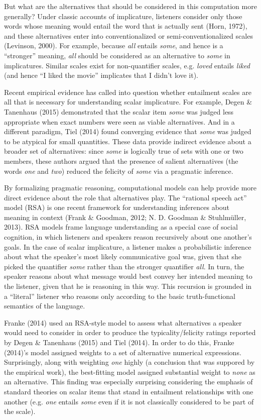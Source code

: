 \documentclass[10pt, letterpaper]{article}
\begin{document}
But what are the alternatives that should be considered in this
computation more generally? Under classic accounts of implicature,
listeners consider only those words whose meaning would entail the word
that is actually sent (Horn, 1972), and these alternatives enter into
conventionalized or semi-conventionalized scales (Levinson, 2000). For
example, because \emph{all} entails \emph{some}, and hence is a
``stronger'' meaning, \emph{all} should be considered as an alternative
to \emph{some} in implicatures. Similar scales exist for non-quantifier
scales, e.g. \emph{loved} entails \emph{liked} (and hence ``I liked the
movie'' implicates that I didn't love it).

Recent empirical evidence has called into question whether entailment
scales are all that is necessary for understanding scalar implicature.
For example, Degen \& Tanenhaus (2015) demonstrated that the scalar item
\emph{some} was judged less appropriate when exact numbers were seen as
viable alternatives. And in a different paradigm, Tiel (2014) found
converging evidence that \emph{some} was judged to be atypical for small
quantities. These data provide indirect evidence about a broader set of
alternatives: since \emph{some} is logically true of sets with one or
two members, these authors argued that the presence of salient
alternatives (the words \emph{one} and \emph{two}) reduced the felicity
of \emph{some} via a pragmatic inference.

By formalizing pragmatic reasoning, computational models can help
provide more direct evidence about the role that alternatives play. The
``rational speech act'' model (RSA) is one recent framework for
understanding inferences about meaning in context (Frank \& Goodman,
2012; N. D. Goodman \& Stuhlm{ü}ller, 2013). RSA models frame language
understanding as a special case of social cognition, in which listeners
and speakers reason recursively about one another's goals. In the case
of scalar implicature, a listener makes a probabilistic inference about
what the speaker's most likely communicative goal was, given that she
picked the quantifier \emph{some} rather than the stronger quantifier
\emph{all}. In turn, the speaker reasons about what message would best
convey her intended meaning to the listener, given that he is reasoning
in this way. This recursion is grounded in a ``literal'' listener who
reasons only according to the basic truth-functional semantics of the
language.

Franke (2014) used an RSA-style model to assess what alternatives a
speaker would need to consider in order to produce the
typicality/felicity ratings reported by Degen \& Tanenhaus (2015) and
Tiel (2014). In order to do this, Franke (2014)'s model assigned weights
to a set of alternative numerical expressions. Surprisingly, along with
weighting \emph{one} highly (a conclusion that was suppored by the
empirical work), the best-fitting model assigned substantial weight to
\emph{none} as an alternative. This finding was especially surprising
considering the emphasis of standard theories on scalar items that stand
in entailment relationships with one another (e.g. \emph{one} entails
\emph{some} even if it is not classically considered to be part of the
scale).
\end{document}
